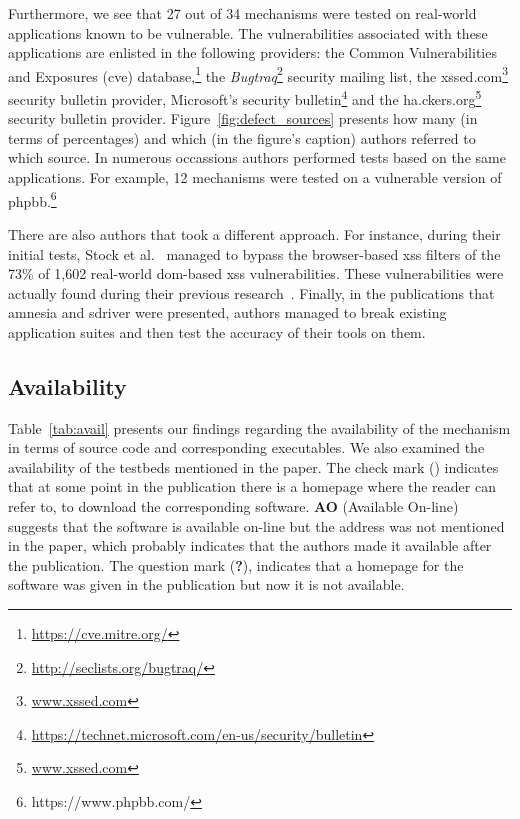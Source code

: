 \documentclass[conference]{IEEEtran}
\newcommand{\tick}{\ding{52}}
\begin{document}
Furthermore, we see that 27 out of
34 mechanisms were tested on real-world applications
known to be vulnerable. The vulnerabilities
associated with these applications are enlisted
in the following providers: the Common Vulnerabilities
and Exposures ({\sc cve})
database,\footnote{\url{https://cve.mitre.org/}}
the {\it Bugtraq}\footnote{\url{http://seclists.org/bugtraq/}}
security mailing list, the
{\sc xss}ed.com\footnote{\url{www.xssed.com}}
security bulletin provider, Microsoft's security
bulletin\footnote{\url{https://technet.microsoft.com/en-us/security/bulletin}}
and the ha.ckers.org\footnote{\url{www.xssed.com}}
security bulletin provider. Figure~\ref{fig:defect_sources}
presents how many (in terms of percentages) and which
(in the figure's caption) authors referred to which source.
In numerous occassions authors performed tests based
on the same applications. For example, 12 mechanisms
were tested on a vulnerable version of
{\sc phpbb}.\footnote{https://www.phpbb.com/}

There are also authors that took a different approach.
For instance, during their initial tests,
Stock et al.~\cite{SLMS14} managed to bypass
the browser-based {\sc xss} filters of the
73\% of 1,602 real-world {\sc dom}-based {\sc xss} vulnerabilities.
These vulnerabilities were actually found during
their previous research~\cite{LSJ13}.
Finally, in the publications that
{\sc amnesia} and {\sc sd}river were presented,
authors managed to break existing application suites
and then test the accuracy of their tools on them.




\subsection{Availability}

Table~\ref{tab:avail} presents our findings regarding the availability
of the mechanism in terms of source code and corresponding
executables. We also examined the availability of the testbeds
mentioned in the paper. The check mark (\tick) indicates that at some
point in the publication there is a homepage where the reader can
refer to, to download the corresponding software. {\bf AO} (Available
On-line) suggests that the software is available on-line but the
address was not mentioned in the paper, which probably indicates that
the authors made it available after the publication. The question mark
({\bf ?}), indicates that a homepage for the software was given in the
publication but now it is not available.
\end{document}
